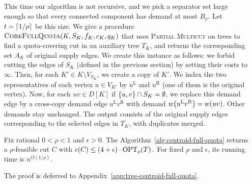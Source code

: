 This time our algorithm is not recursive, and we pick a separator set large enough so that every connected component has demand at most $B_\rho$. Let $t=\mathopen{}\left\lceil 1/\rho \right\rceil$ be this size.
We give a procedure $\textsc{CoreFullQuota}(K,S_K,f_K,c_K,q_K)$ that uses \textsc{Partial Multicut} on trees to find a quota-covering cut in an auxiliary tree $T_K$, and returns the corresponding set $A_K$ of original supply edges. We create this instance as follows: we forbid cutting the edges of $S_K$ (defined in the previous section) by setting their costs to $\infty$. Then, for each $K'\in K\setminus V_{S_K}$, we create a copy of $K'$. We index the two representatives of each vertex $u\in V_{K'}$ by $u^{\mathrm L}$ and $u^{\mathrm R}$ (one of them is the original vertex). Now, for each $uv\in D[K]$ if $\mathopen{}\left\{ u, v \right\}\cap {S_K}=\emptyset$, we replace this demand edge by a cross-copy demand edge $u^{\mathrm L}v^{\mathrm R}$ with demand $w\mathopen{}\left( u^{\mathrm L}v^{\mathrm R} \right)=w\mathopen{}\left( uv \right)$. Other demands stay unchanged. The output consists of the original supply edges corresponding to the selected edges in $T_K$, with duplicates merged.


%

\begin{theorem}\label{thm:tree-centroid-full-quota}
    Fix rational $0<\rho<1$ and $\epsilon>0$. The Algorithm~\ref{alg:centroid-full-quota} returns a $\rho$-feasible cut $C$ with $
        c(C)\leq(4+\epsilon)\cdot \textup{OPT}_{\rho}\mathopen{}\left( T \right).$
    For fixed $\rho$ and $\epsilon$, its running time is $n^{O(1/\rho)}$.
\end{theorem}
The proof is deferred to Appendix~\ref{app:tree-centroid-full-quota}.



